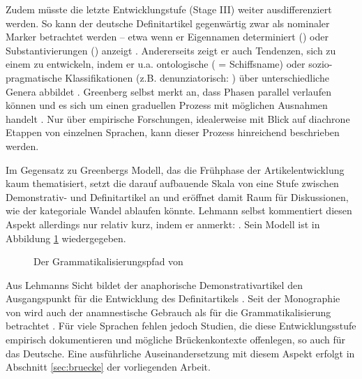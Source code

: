 Zudem müsste die letzte Entwicklungstufe (Stage III) weiter ausdifferenziert werden. So kann der deutsche Definitartikel gegenwärtig zwar als nominaler Marker betrachtet werden -- etwa wenn er Eigennamen determiniert () oder Substantivierungen () anzeigt \parencite[71]{Szczepaniak2011a}. Andererseits zeigt er auch Tendenzen, sich zu einem  zu entwickeln, indem er u.a. ontologische ( = Schiffsname) oder sozio-pragmatische Klassifikationen (z.B. denunziatorisch: ) über unterschiedliche Genera abbildet \parencite{Nubling2014}. Greenberg selbst merkt an, dass Phasen parallel verlaufen können und es sich um einen graduellen Prozess mit möglichen Ausnahmen handelt \parencite[61]{Greenberg1978}. Nur über empirische Forschungen, idealerweise mit Blick auf diachrone Etappen von einzelnen Sprachen, kann dieser Prozess hinreichend beschrieben werden. 

Im Gegensatz zu Greenbergs Modell, das die Frühphase der Artikelentwicklung kaum thematisiert, setzt die darauf aufbauende Skala von \textcite{Lehmann2015} eine Stufe zwischen  Demonstrativ- und Definitartikel an und eröffnet damit Raum für Diskussionen, wie der kategoriale Wandel ablaufen könnte. Lehmann selbst kommentiert diesen Aspekt allerdings nur relativ kurz, indem er anmerkt: \parencite[41]{Lehmann2015}. Sein Modell ist in Abbildung \ref{abb:lehmann} wiedergegeben. 

\begin{figure}
\begin{center}
\caption {Der Grammatikalisierungspfad von \textcite[59]{Lehmann2015}}
\label{abb:lehmann}
\end{center}
\end{figure}

Aus Lehmanns Sicht bildet der anaphorische Demonstrativartikel den Ausgangspunkt für die Entwicklung des Definitartikels \parencite[ebenso:][]{Greenberg1978,Lyons1999}. Seit der Monographie von \textcite{Himmelmann1997} wird auch der anamnestische Gebrauch als  für die Grammatikalisierung \parencite[74]{Szczepaniak2011a} betrachtet \parencite[s. hierzu auch den Überblick in][527]{deMulder2011}. Für viele Sprachen fehlen jedoch Studien, die diese Entwicklungsstufe empirisch dokumentieren und mögliche  Brückenkontexte \parencite[84]{Heine2002a} offenlegen, so auch für das Deutsche. Eine ausführliche  Auseinandersetzung mit diesem Aspekt erfolgt in Abschnitt \ref{sec:bruecke} der vorliegenden Arbeit.

